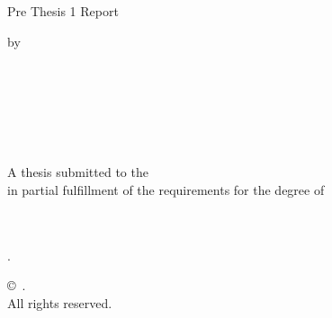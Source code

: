 \begin{titlepage}
\centering
{\large Pre Thesis 1 Report\par}
\vspace{1.5cm}
{\LARGE\bfseries \thesistitle\par}
\vspace{1.5cm}
{\large by\par}
\vspace{0.6cm}
{\large
\studentA\\ \idA\\[4pt]
\studentB\\ \idB\\[4pt]
\studentC\\ \idC\par}
\vspace{1.5cm}
{A thesis submitted to the \department\\
in partial fulfillment of the requirements for the degree of\\
\degree\par}
\vfill
{\department\\
\university\\
\submissionmonth.\par}
\vspace{1cm}
{\copyright\ \submissionyear. \university\\
All rights reserved.\par}
\end{titlepage}
